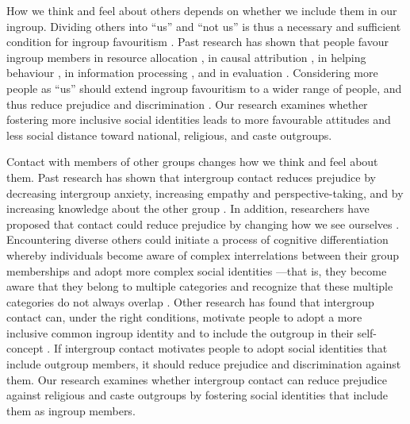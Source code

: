 \documentclass[12pt, a4paper]{article}
\begin{document}
How we think and feel about others depends on whether we include them in our ingroup. Dividing others into “us” and “not us” is thus a necessary and sufficient condition for ingroup favouritism \parencite{tajfel_human_1981}. Past research has shown that people favour ingroup members in resource allocation \parencite{tajfel_social_1971}, in causal attribution \parencite{hewstone_ultimate_1990, taylor_ethnocentrism_1974}, in helping behaviour \parencite{levine_identity_2005}, in information processing \parencite{van_bavel_neural_2008}, and in evaluation \parencite{otten_evidence_2000}. Considering more people as “us” should extend ingroup favouritism to a wider range of people, and thus reduce prejudice and discrimination \parencite[for a review, see][]{nelson_common_2016}. Our research examines whether fostering more inclusive social identities leads to more favourable attitudes and less social distance toward national, religious, and caste outgroups.

Contact with members of other groups changes how we think and feel about them. Past research has shown that intergroup contact reduces prejudice \parencite{pettigrew_meta-analytic_2006} by decreasing intergroup anxiety, increasing empathy and perspective-taking, and by increasing knowledge about the other group \parencite{pettigrew_how_2008}. In addition, researchers have proposed that contact could reduce prejudice by changing how we see ourselves \parencite{pettigrew_generalized_1997, pettigrew_intergroup_1998}. Encountering diverse others could initiate a process of cognitive differentiation \parencite{kramer_social_2011} whereby individuals become aware of complex interrelations between their group memberships and adopt more complex social identities \parencite{schmid_antecedents_2009}---that is, they become aware that they belong to multiple categories and recognize that these multiple categories do not always overlap \parencite{van_dommelen_construing_2015}. Other research has found that intergroup contact can, under the right conditions, motivate people to adopt a more inclusive common ingroup identity \parencite{gaertner_contact_1994} and to include the outgroup in their self-concept \parencite{page-gould_understanding_2010}. If intergroup contact motivates people to adopt social identities that include outgroup members, it should reduce prejudice and discrimination against them. Our research examines whether intergroup contact can reduce prejudice against religious and caste outgroups by fostering social identities that include them as ingroup members.
\end{document}
